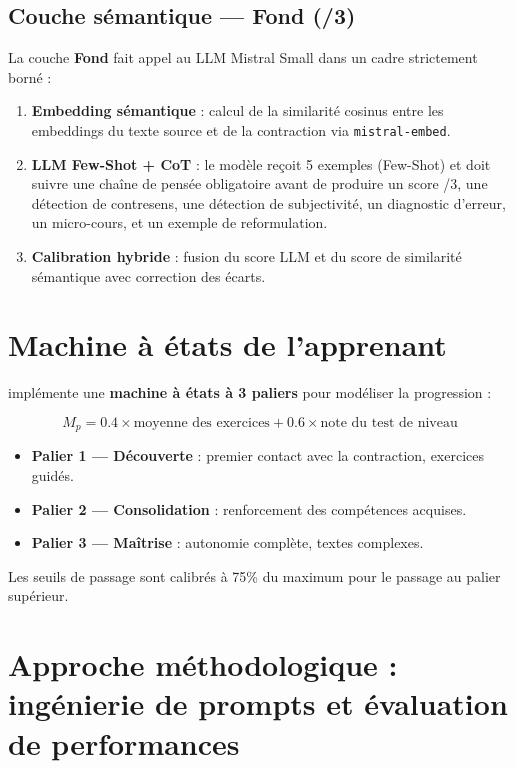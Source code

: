 \subsection{Couche sémantique — Fond (/3)}

La couche \textbf{Fond} fait appel au LLM Mistral Small dans un cadre strictement borné :

\begin{enumerate}
    \item \textbf{Embedding sémantique} : calcul de la similarité cosinus entre les embeddings du texte source et de la contraction via \texttt{mistral-embed}.
    \item \textbf{LLM Few-Shot + CoT} : le modèle reçoit 5 exemples (Few-Shot) et doit suivre une chaîne de pensée obligatoire avant de produire un score /3, une détection de contresens, une détection de subjectivité, un diagnostic d'erreur, un micro-cours, et un exemple de reformulation.
    \item \textbf{Calibration hybride} : fusion du score LLM et du score de similarité sémantique avec correction des écarts.
\end{enumerate}

\section{Machine à états de l'apprenant}

\AZIZA implémente une \textbf{machine à états à 3 paliers} pour modéliser la progression :

\[
M_p = 0.4 \times \text{moyenne des exercices} + 0.6 \times \text{note du test de niveau}
\]

\begin{itemize}
    \item \textbf{Palier 1 — Découverte} : premier contact avec la contraction, exercices guidés.
    \item \textbf{Palier 2 — Consolidation} : renforcement des compétences acquises.
    \item \textbf{Palier 3 — Maîtrise} : autonomie complète, textes complexes.
\end{itemize}

Les seuils de passage sont calibrés à 75\% du maximum pour le passage au palier supérieur.

\section{Approche méthodologique : ingénierie de prompts et évaluation de performances}

